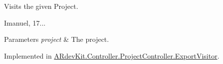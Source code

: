 Visits the given Project. 

Imanuel, 17... 


\begin{DoxyParams}{Parameters}
{\em project} & The project. \\
\hline
\end{DoxyParams}


Implemented in \hyperlink{class_a_rdev_kit_1_1_controller_1_1_project_controller_1_1_export_visitor_ad58774c6778421b6bf85a6c70029a3d9}{A\-Rdev\-Kit.\-Controller.\-Project\-Controller.\-Export\-Visitor}.

